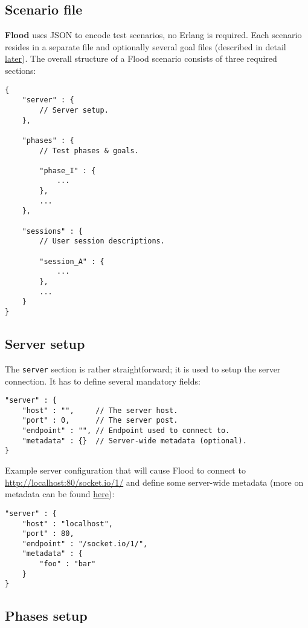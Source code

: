 \documentclass[a4paper]{article}
\begin{document}
\subsection{Scenario file}
\label{sec-3-1}

\textbf{Flood} uses JSON to encode test scenarios, no Erlang is required. Each scenario resides in a separate file and optionally several goal files (described in detail \hyperref[sec-4-2]{later}). The overall structure of a Flood scenario consists of three required sections:


\begin{verbatim}
{
    "server" : {
        // Server setup.
    },

    "phases" : {
        // Test phases & goals.

        "phase_I" : {
            ...
        },
        ...
    },

    "sessions" : {
        // User session descriptions.

        "session_A" : {
            ...
        },
        ...
    }
}
\end{verbatim}
\subsection{Server setup}
\label{sec-3-2}

The \texttt{server} section is rather straightforward; it is used to setup the server connection. It has to define several mandatory fields:


\begin{verbatim}
"server" : {
    "host" : "",     // The server host.
    "port" : 0,      // The server post.
    "endpoint" : "", // Endpoint used to connect to.
    "metadata" : {}  // Server-wide metadata (optional).
}
\end{verbatim}




\noindent
Example server configuration that will cause Flood to connect to \href{http://localhost:80/socket.io/1/}{http://localhost:80/socket.io/1/} and define some server-wide metadata (more on metadata can be found \hyperref[sec-3-6]{here}):


\begin{verbatim}
"server" : {
    "host" : "localhost",
    "port" : 80,
    "endpoint" : "/socket.io/1/",
    "metadata" : {
        "foo" : "bar"
    }
}
\end{verbatim}
\subsection{Phases setup}
\label{sec-3-3}
\label{ref-phase_setup}
\end{document}
